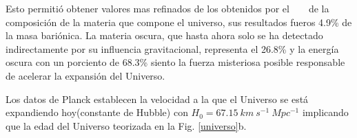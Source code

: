 Esto permitió obtener valores mas refinados de los obtenidos por el ~ \WMAP ~ de la composición de la materia que compone el universo, sus resultados fueros 4.9\% de la masa bariónica. La materia oscura, que hasta ahora solo se ha detectado indirectamente por su influencia gravitacional, representa el 26.8\% y la energía oscura con un porciento de 68.3\% siento la fuerza misteriosa posible responsable de acelerar la expansión del Universo.

Los datos de Planck establecen la velocidad a la que el Universo se está expandiendo hoy(constante de Hubble) con $H_0 = 67.15~km~s^{-1} ~Mpc^{-1}$ implicando que la edad del Universo teorizada en la Fig. \ref{universo}b. 










